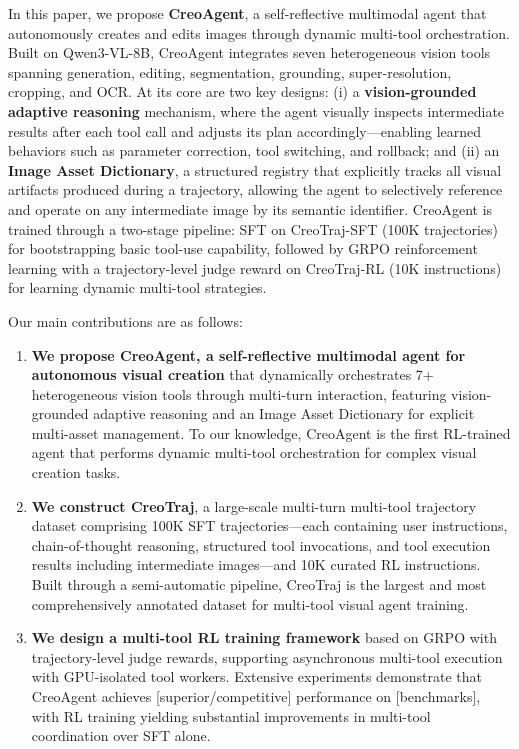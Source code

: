 \documentclass[11pt]{article}
\begin{document}
In this paper, we propose \textbf{CreoAgent}, a self-reflective multimodal agent that autonomously creates and edits images through dynamic multi-tool orchestration. Built on Qwen3-VL-8B, CreoAgent integrates seven heterogeneous vision tools spanning generation, editing, segmentation, grounding, super-resolution, cropping, and OCR. At its core are two key designs: (i) a \textbf{vision-grounded adaptive reasoning} mechanism, where the agent visually inspects intermediate results after each tool call and adjusts its plan accordingly—enabling learned behaviors such as parameter correction, tool switching, and rollback; and (ii) an \textbf{Image Asset Dictionary}, a structured registry that explicitly tracks all visual artifacts produced during a trajectory, allowing the agent to selectively reference and operate on any intermediate image by its semantic identifier. CreoAgent is trained through a two-stage pipeline: SFT on CreoTraj-SFT (100K trajectories) for bootstrapping basic tool-use capability, followed by GRPO reinforcement learning with a trajectory-level judge reward on CreoTraj-RL (10K instructions) for learning dynamic multi-tool strategies.

Our main contributions are as follows:

\begin{enumerate}
    \item \textbf{We propose CreoAgent, a self-reflective multimodal agent for autonomous visual creation} that dynamically orchestrates 7+ heterogeneous vision tools through multi-turn interaction, featuring vision-grounded adaptive reasoning and an Image Asset Dictionary for explicit multi-asset management. To our knowledge, CreoAgent is the first RL-trained agent that performs dynamic multi-tool orchestration for complex visual creation tasks.

    \item \textbf{We construct CreoTraj}, a large-scale multi-turn multi-tool trajectory dataset comprising 100K SFT trajectories—each containing user instructions, chain-of-thought reasoning, structured tool invocations, and tool execution results including intermediate images—and 10K curated RL instructions. Built through a semi-automatic pipeline, CreoTraj is the largest and most comprehensively annotated dataset for multi-tool visual agent training.

    \item \textbf{We design a multi-tool RL training framework} based on GRPO with trajectory-level judge rewards, supporting asynchronous multi-tool execution with GPU-isolated tool workers. Extensive experiments demonstrate that CreoAgent achieves [superior/competitive] performance on [benchmarks], with RL training yielding substantial improvements in multi-tool coordination over SFT alone.
\end{enumerate}
\end{document}
